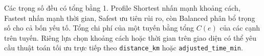 Các trọng số đều có tổng bằng 1. Profile Shortest nhấn mạnh khoảng cách,
Fastest nhấn mạnh thời gian, Safest ưu tiên rủi ro, còn Balanced phân bổ trọng
số cho cả bốn yếu tố. Tổng chi phí của một tuyến bằng tổng $C(e)$ của các cạnh
trên tuyến. Riêng lựa chọn khoảng cách hoặc thời gian trên giao diện có thể yêu
cầu thuật toán tối ưu trực tiếp theo \texttt{distance\_km} hoặc
\texttt{adjusted\_time\_min}.

